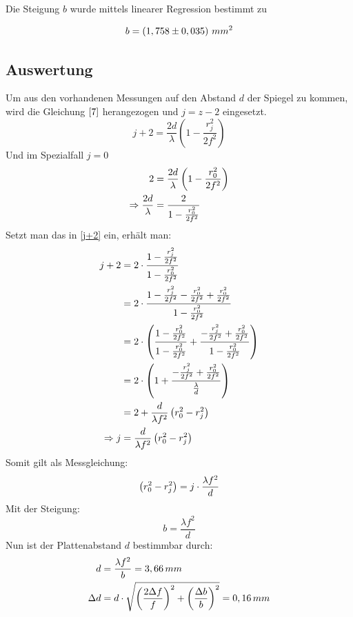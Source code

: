 Die Steigung \(b\) wurde mittels linearer Regression bestimmt zu

\begin{equation}
b = \left( 1,758 \pm 0,035 \right)\,mm^2
\notag
\end{equation}

\subsection{Auswertung}
Um aus den vorhandenen Messungen auf den Abstand \(d\) der Spiegel zu kommen, wird die Gleichung $\eqref{7}$ herangezogen und \(j = z - 2 \) eingesetzt.
\begin{equation}
j + 2 = \frac{2d}{\lambda}\left(1 - \frac{r_j^2}{2f^2}\right)
\label{j+2}
\end{equation}
Und im Spezialfall \(j=0\)
\begin{align}
2 &= \frac{2d}{\lambda}\left(1 - \frac{r_0^2}{2f^2}\right)
\notag\\
\Rightarrow \frac{2d}{\lambda} &= \frac{2}{1 - \frac{r_0^2}{2f^2}}
\notag
\end{align}
Setzt man das in \eqref{j+2} ein, erhält man:
\begin{align}
j+2 &= 2 \cdot \frac{1 - \frac{r_j^2}{2f^2}}{1 - \frac{r_0^2}{2f^2}} \notag \\
&= 2 \cdot \frac{1 - \frac{r_j^2}{2f^2} - \frac{r_0^2}{2f^2} + \frac{r_0^2}{2f^2}}{1 - \frac{r_0^2}{2f^2}} \notag \\
 &= 2 \cdot \left( \frac{1 - \frac{r_0^2}{2f^2}}{1 - \frac{r_0^2}{2f^2}} + \frac{- \frac{r_j^2}{2f^2} + \frac{r_0^2}{2f^2}}{1 - \frac{r_0^2}{2f^2}}\right) \notag \\
 &= 2 \cdot \left( 1 + \frac{- \frac{r_j^2}{2f^2} + \frac{r_0^2}{2f^2}}{\frac{\lambda}{d}} \right) \notag \\
 &= 2 + \frac{d}{\lambda f^2} \left( r_0^2 - r_j^2 \right) \notag \\
 \Rightarrow j &= \frac{d}{\lambda f^2} \left( r_0^2 - r_j^2 \right) \notag
\end{align}
Somit gilt als Messgleichung: 
\begin{equation}
\left( r_0^2 - r_j^2 \right) = j \cdot \frac{\lambda f^2}{d} \notag
\end{equation}
Mit der Steigung:
\begin{equation}
b = \frac{\lambda f^2}{d}
\label{b}
\end{equation}
Nun ist der Plattenabstand \(d\) bestimmbar durch:
\begin{align}
d &= \frac{\lambda f^2}{b} = 3,66\,mm \notag\\
\Delta d &= d\cdot \sqrt{
\left( \frac{2\Delta f}{f} \right)^2+
\left( \frac{\Delta b}{b} \right)^2
} = 0,16\,mm \notag
\end{align}
